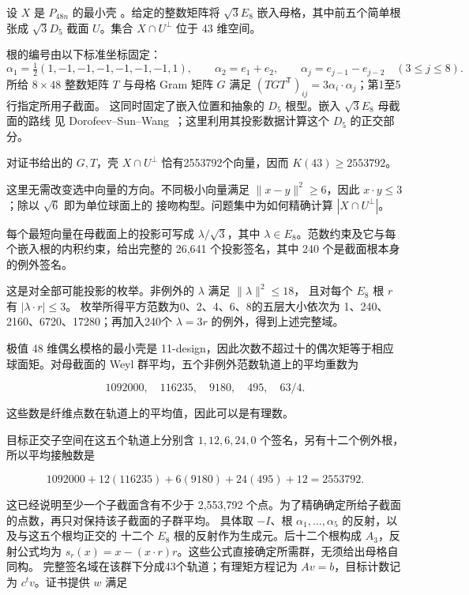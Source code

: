 设 \(X\) 是 \(P_{48n}\) 的最小壳 \cite{latticecatalogue}。给定的整数矩阵将 \(\sqrt3E_8\)
嵌入母格，其中前五个简单根张成 \(\sqrt3D_5\) 截面 \(U\)。集合
\(X\cap U^\perp\) 位于 43 维空间。

根的编号由以下标准坐标固定：
\[
\alpha_1=\tfrac12(1,-1,-1,-1,-1,-1,-1,1),\qquad
\alpha_2=e_1+e_2,\qquad
\alpha_j=e_{j-1}-e_{j-2}\quad(3\le j\le8).
\]
所给 $8\times48$ 整数矩阵 $T$ 与母格 Gram 矩阵 $G$ 满足
$(TGT^{\mathsf T})_{ij}=3\alpha_i\cdot\alpha_j$；第1至5行指定所用子截面。
这同时固定了嵌入位置和抽象的 $D_5$ 根型。嵌入 $\sqrt3E_8$ 母截面的路线
见 Dorofeev--Sun--Wang~\cite{dorofeev}；这里利用其投影数据计算这个
$D_5$ 的正交部分。

\begin{proposition}
\label{prop:section43}
对证书给出的 $G,T$，壳 $X\cap U^\perp$ 恰有2553792个向量，因而
$K(43)\ge2553792$。
\end{proposition}

这里无需改变选中向量的方向。不同极小向量满足
$\|x-y\|^2\ge6$，因此 $x\cdot y\le3$；除以 $\sqrt6$ 即为单位球面上的
接吻构型。问题集中为如何精确计算 $|X\cap U^\perp|$。

每个最短向量在母截面上的投影可写成 \(\lambda/\sqrt3\)，其中
\(\lambda\in E_8\)。范数约束及它与每个嵌入根的内积约束，给出完整的
26,641 个投影签名，其中 240 个是截面根本身的例外签名。

这是对全部可能投影的枚举。非例外的 $\lambda$ 满足 $\|\lambda\|^2\le18$，
且对每个 $E_8$ 根 $r$ 有 $|\lambda\cdot r|\le3$。
枚举所得平方范数为0、2、4、6、8的五层大小依次为
1、240、2160、6720、17280；再加入240个 $\lambda=3r$ 的例外，得到上述完整域。

极值 48 维偶幺模格的最小壳是
11-design，因此次数不超过十的偶次矩等于相应球面矩。对母截面的 Weyl
群平均，五个非例外范数轨道上的平均重数为

\[
1092000,\quad116235,\quad9180,\quad495,\quad63/4.
\]

这些数是纤维点数在轨道上的平均值，因此可以是有理数。

目标正交子空间在这五个轨道上分别含 \(1,12,6,24,0\)
个签名，另有十二个例外根，所以平均接触数是

\[
1092000+12(116235)+6(9180)+24(495)+12=2553792.
\]

这已经说明至少一个子截面含有不少于 2,553,792
个点。为了精确确定所给子截面的点数，再只对保持该子截面的子群平均。
具体取 $-I$、根 $\alpha_1,\ldots,\alpha_5$ 的反射，以及与这五个根均正交的
十二个 $E_8$ 根的反射作为生成元。后十二个根构成 $A_3$，反射公式均为
$s_r(x)=x-(x\cdot r)r$。这些公式直接确定所需群，无须给出母格自同构。
完整签名域在该群下分成43个轨道；有理矩方程记为 \(Av=b\)，目标计数记为 \(c^tv\)。证书提供
\(w\) 满足

